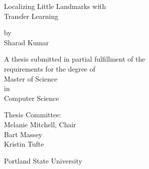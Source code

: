 \documentclass [11pt,letterpaper ,openany ]{report}
\title{}
\date{}
\begin{document}
  \begin{titlepage}
      \begin{center}
          \vspace*{1cm}
          
          \Huge
          Localizing Little Landmarks with \\ 
          Transfer Learning
          
          
          \vspace{2cm}
          \normalsize
          by\\
          Sharad Kumar
          
          \vspace{5cm}
          
          \normalsize
          A thesis submitted in partial fulfillment of the \\
          requirements for the degree of \\
          Master of Science \\
          in \\
          Computer Science

          
          \vspace{3cm}
          
          Thesis Committee: \\
          Melanie Mitchell, Chair \\
          Bart Massey \\
          Kristin Tufte

          \vspace{1cm}
          Portland State University\\
          \the\year
          
      \end{center}
  \end{titlepage}

    \maketitle
\end{document}
